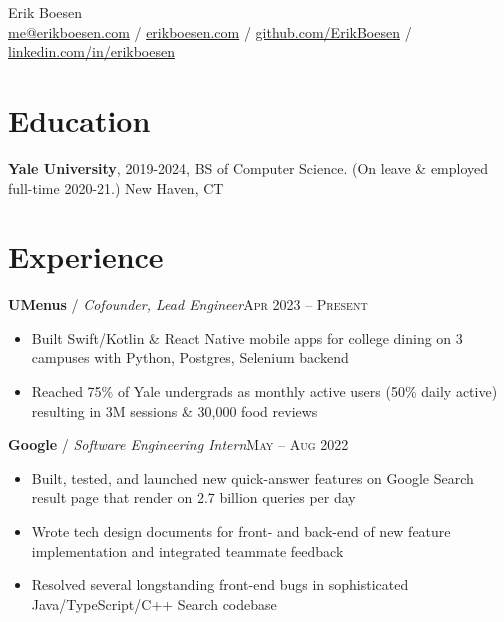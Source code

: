 \documentclass[10pt, a4paper]{article}
\begin{document}
{\LARGE Erik Boesen}\\
\href{mailto:me@erikboesen.com}{me@erikboesen.com} / \href{https://erikboesen.com}{erikboesen.com} / \href{https://github.com/ErikBoesen}{github.com/ErikBoesen} / \href{https://www.linkedin.com/in/erikboesen}{linkedin.com/in/erikboesen}\\

\vspace{-7mm}
\section*{Education}
\noindent
\textbf{Yale University}, 2019-2024, BS of Computer Science. (On leave \& employed full-time 2020-21.) New Haven, CT\\

\vspace{-7mm}
\section*{Experience}
\textbf{UMenus} / \textit{Cofounder, Lead Engineer}\hfill \textsc{Apr 2023 -- Present}\\
\begin{itemize}
    \vspace{-7mm}
    \item Built Swift/Kotlin \& React Native mobile apps for college dining on 3 campuses with Python, Postgres, Selenium backend
    \item Reached 75\% of Yale undergrads as monthly active users (50\% daily active) resulting in 3M sessions \& 30,000 food reviews

\end{itemize}

\textbf{Google} / \textit{Software Engineering Intern}\hfill \textsc{May -- Aug 2022}\\
\begin{itemize}
    \vspace{-7mm}
    \item Built, tested, and launched new quick-answer features on Google Search result page that render on 2.7 billion queries per day
    \item Wrote tech design documents for front- and back-end of new feature implementation and integrated teammate feedback
    \item Resolved several longstanding front-end bugs in sophisticated Java/TypeScript/C++ Search codebase
\end{itemize}
\end{document}
